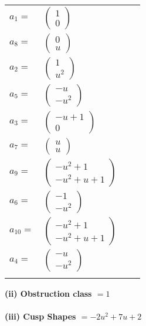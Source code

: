 \documentclass[1p]{elsarticle_modified}
\theoremstyle{definition}
\begin{document}
\begin{tabular}{m{7pt} m{180pt} m{7pt} m{180pt} }
\flushright $a_{1}=$&$\begin{pmatrix}1\\0\end{pmatrix}$ \\
\flushright $a_{8}=$&$\begin{pmatrix}0\\u\end{pmatrix}$ \\
\flushright $a_{2}=$&$\begin{pmatrix}1\\u^2\end{pmatrix}$ \\
\flushright $a_{5}=$&$\begin{pmatrix}- u\\- u^2\end{pmatrix}$ \\
\flushright $a_{3}=$&$\begin{pmatrix}- u+1\\0\end{pmatrix}$ \\
\flushright $a_{7}=$&$\begin{pmatrix}u\\u\end{pmatrix}$ \\
\flushright $a_{9}=$&$\begin{pmatrix}- u^2+1\\- u^2+u+1\end{pmatrix}$ \\
\flushright $a_{6}=$&$\begin{pmatrix}-1\\- u^2\end{pmatrix}$ \\
\flushright $a_{10}=$&$\begin{pmatrix}- u^2+1\\- u^2+u+1\end{pmatrix}$ \\
\flushright $a_{4}=$&$\begin{pmatrix}- u\\- u^2\end{pmatrix}$\\&\end{tabular}
\flushleft \textbf{(ii) Obstruction class $= 1$}\\~\\
\flushleft \textbf{(iii) Cusp Shapes $= -2 u^2+7 u+2$}\\~\\
\end{document}
